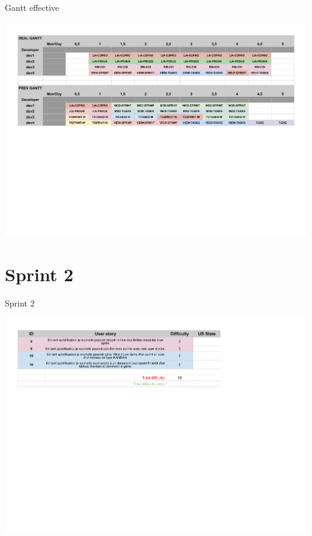 \documentclass{beamer}
\begin{document}
\begin{frame}{Gantt effective}
	\begin{center}
        \includegraphics[scale=0.41]{Gantt2real.pdf}
        \end{center}
\end{frame}

\section{Sprint 2}

\begin{frame}{Sprint 2}
	\begin{center}
        \includegraphics[scale=0.55]{Sprint3.pdf}
        \end{center}
\end{frame}
\end{document}
